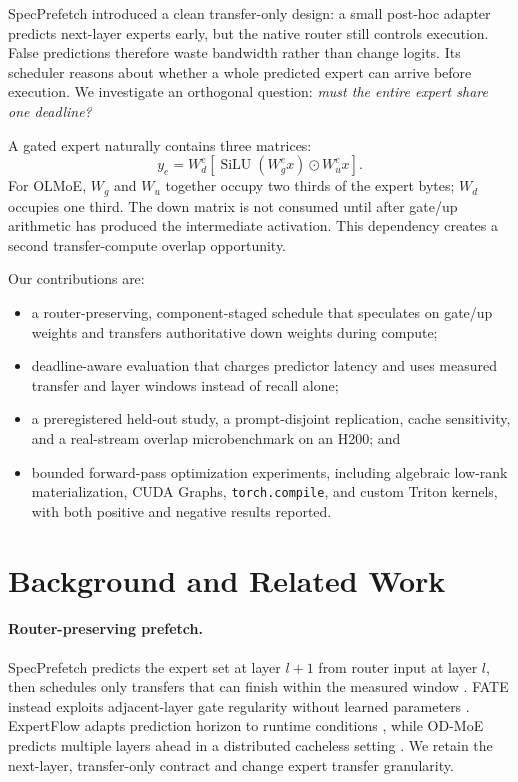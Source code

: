 \documentclass[10pt,twocolumn]{article}
\begin{document}
SpecPrefetch \cite{kong2026specprefetch} introduced a clean transfer-only
design: a small post-hoc adapter predicts next-layer experts early, but the
native router still controls execution.  False predictions therefore waste
bandwidth rather than change logits.  Its scheduler reasons about whether a
whole predicted expert can arrive before execution.  We investigate an
orthogonal question: \emph{must the entire expert share one deadline?}

A gated expert naturally contains three matrices:
\begin{equation}
y_e = W^{e}_{d}\left[
  \operatorname{SiLU}(W^{e}_{g}x)\odot W^{e}_{u}x
\right].
\label{eq:expert}
\end{equation}
For OLMoE, $W_g$ and $W_u$ together occupy two thirds of the expert bytes;
$W_d$ occupies one third.  The down matrix is not consumed until after
gate/up arithmetic has produced the intermediate activation.  This dependency
creates a second transfer-compute overlap opportunity.

Our contributions are:
\begin{itemize}
  \item a router-preserving, component-staged schedule that speculates on
  gate/up weights and transfers authoritative down weights during compute;
  \item deadline-aware evaluation that charges predictor latency and uses
  measured transfer and layer windows instead of recall alone;
  \item a preregistered held-out study, a prompt-disjoint replication, cache
  sensitivity, and a real-stream overlap microbenchmark on an H200; and
  \item bounded forward-pass optimization experiments, including algebraic
  low-rank materialization, CUDA Graphs, \texttt{torch.compile}, and custom
  Triton kernels, with both positive and negative results reported.
\end{itemize}

\section{Background and Related Work}
\paragraph{Router-preserving prefetch.}
SpecPrefetch predicts the expert set at layer $l+1$ from router input at layer
$l$, then schedules only transfers that can finish within the measured window
\cite{kong2026specprefetch}.  FATE instead exploits adjacent-layer gate
regularity without learned parameters \cite{fang2025fate}.  ExpertFlow adapts
prediction horizon to runtime conditions \cite{shen2025expertflow}, while
OD-MoE predicts multiple layers ahead in a distributed cacheless setting
\cite{wang2025odmoe}.  We retain the next-layer, transfer-only contract and
change expert transfer granularity.
\end{document}
